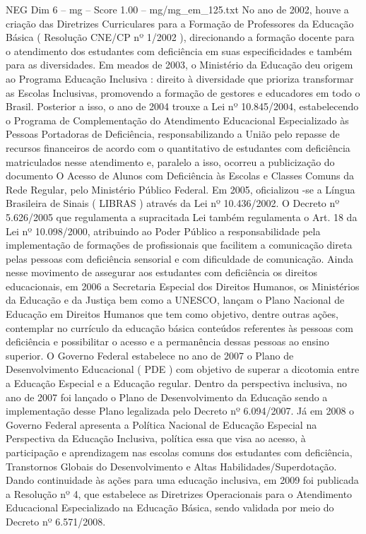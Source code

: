 \begin{textsample}{NEG Dim 6 – mg – Score 1.00 – mg/mg\_em\_125.txt}
No ano de 2002, houve a criação das Diretrizes Curriculares para a Formação de Professores da Educação Básica ( Resolução CNE/CP nº 1/2002 ), direcionando a formação docente para o atendimento dos estudantes com deficiência em suas especificidades e também para as diversidades.
Em meados de 2003, o Ministério da Educação deu origem ao Programa Educação Inclusiva : direito à diversidade que prioriza transformar as Escolas Inclusivas, promovendo a formação de gestores e educadores em todo o Brasil.
Posterior a isso, o ano de 2004 trouxe a Lei nº 10.845/2004, estabelecendo o Programa de Complementação do Atendimento Educacional Especializado às Pessoas Portadoras de Deficiência, responsabilizando a União pelo repasse de recursos financeiros de acordo com o quantitativo de estudantes com deficiência matriculados nesse atendimento e, paralelo a isso, ocorreu a publicização do documento O Acesso de Alunos com Deficiência às Escolas e Classes Comuns da Rede Regular, pelo Ministério Público Federal.
Em 2005, oficializou -se a Língua Brasileira de Sinais ( LIBRAS ) através da Lei nº 10.436/2002.
O Decreto nº 5.626/2005 que regulamenta a supracitada Lei também regulamenta o Art. 18 da Lei nº 10.098/2000, atribuindo ao Poder Público a responsabilidade pela implementação de formações de profissionais que facilitem a comunicação direta pelas pessoas com deficiência sensorial e com dificuldade de comunicação.
Ainda nesse movimento de assegurar aos estudantes com deficiência os direitos educacionais, em 2006 a Secretaria Especial dos Direitos Humanos, os Ministérios da Educação e da Justiça bem como a UNESCO, lançam o Plano Nacional de Educação em Direitos Humanos que tem como objetivo, dentre outras ações, contemplar no currículo da educação básica conteúdos referentes às pessoas com deficiência e possibilitar o acesso e a permanência dessas pessoas ao ensino superior.
O Governo Federal estabelece no ano de 2007 o Plano de Desenvolvimento Educacional ( PDE ) com objetivo de superar a dicotomia entre a Educação Especial e a Educação regular.
Dentro da perspectiva inclusiva, no ano de 2007 foi lançado o Plano de Desenvolvimento da Educação sendo a implementação desse Plano legalizada pelo Decreto nº 6.094/2007.
Já em 2008 o Governo Federal apresenta a Política Nacional de Educação Especial na Perspectiva da Educação Inclusiva, política essa que visa ao acesso, à participação e aprendizagem nas escolas comuns dos estudantes com deficiência, Transtornos Globais do Desenvolvimento e Altas Habilidades/Superdotação.
Dando continuidade às ações para uma educação inclusiva, em 2009 foi publicada a Resolução nº 4, que estabelece as Diretrizes Operacionais para o Atendimento Educacional Especializado na Educação Básica, sendo validada por meio do Decreto nº 6.571/2008.

\end{textsample}
